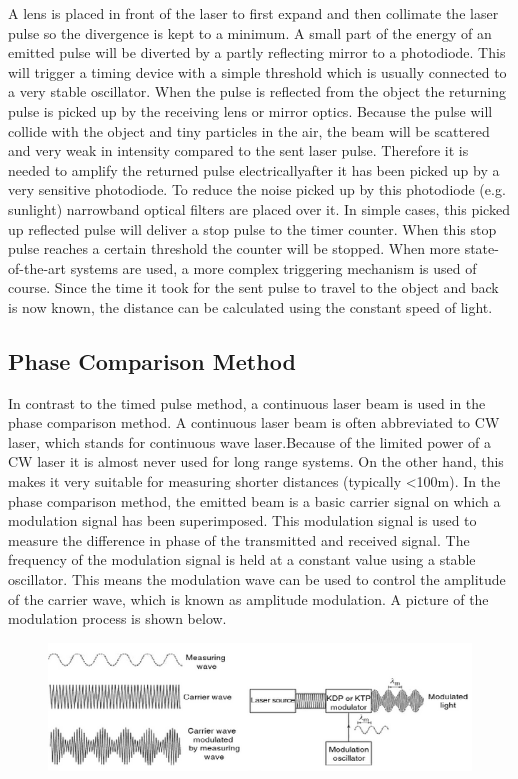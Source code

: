 \documentclass{article}
\begin{document}
A lens is placed in front of the laser to first expand and then collimate the laser pulse so the divergence is kept to a minimum. A small part of the energy of an emitted pulse will be diverted by a partly reflecting mirror to a photodiode. This will trigger a timing device with a simple threshold which is usually connected to a very stable oscillator. When the pulse is reflected from the object the returning pulse is picked up by the receiving lens or mirror optics. Because the pulse will collide with the object and tiny particles in the air, the beam will be scattered and very weak in intensity compared to the sent laser pulse. Therefore it is needed to amplify the returned pulse electricallyafter it has been picked up by a very sensitive photodiode. To reduce the noise picked up by this photodiode (e.g. sunlight) 
narrowband optical filters are placed over it. In simple cases, this picked up reflected pulse will deliver a stop pulse to the timer counter. When this stop pulse reaches a certain threshold the counter will be stopped. When more state-of-the-art systems are used, a more complex triggering mechanism is used of course. Since the time it took for the sent pulse to travel to the object and back is now known, the distance can be calculated using the constant speed of light.

\subsection{Phase Comparison Method}

In contrast to the timed pulse method, a continuous laser beam is used in the phase comparison method. A continuous laser beam is often abbreviated to CW laser, which stands for continuous wave laser.Because of the limited power of a CW laser it is almost never used for long range systems. On the other hand, this makes it very suitable for measuring shorter distances (typically \textless 100m). In the phase comparison method, the emitted beam is a basic carrier signal on which a modulation signal has been superimposed. This modulation signal is used to measure the difference in phase of the transmitted and received signal. The frequency of the modulation signal is held at a constant value using a stable oscillator. This means the modulation wave can be used to control the amplitude of the carrier wave, which is known as amplitude modulation. A picture of the modulation process is shown below. 


\begin{figure}[H]
	\centering
	\includegraphics[scale=1]{figures/Modulation}
	\caption{ }
	\label{lidar2}
\end{figure}
\end{document}
